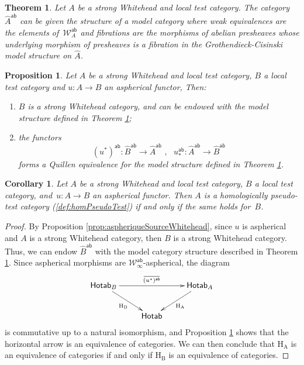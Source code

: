 \documentclass[10pt,a4paper]{amsart}
\newtheorem{prop}{Proposition}
\newtheorem{theorem}{Theorem}
\newtheorem{coro}{Corollary}
\newcommand{\Hf}[1]{\operatorname{H_{#1}}}
\newcommand{\Hotab}{\operatorname{\mathsf{Hotab}}}
\newcommand{\W}{\mathcal{W}}
\newcommand{\Wab}{\W^{\ab}}
\newcommand{\ab}{{\mathsf{ab}}}
\newcommand{\mdvirg}{\text{ ,}\hspace{10pt}}
\newcommand{\overbar}[1]{\mkern 1.5mu\overline{\mkern-1.5mu#1\mkern-1.5mu}\mkern 1.5mu}
\newcommand{\pref}[1]{{\widehat{ #1 }}}
\newcommand{\prefab}[1]{\widehat{ #1 }^{\mathsf{ab}}}
\begin{document}
\begin{theorem}\label{thm:modelStructureAbPresheaves}
Let $A$ be a strong Whitehead and local test category. The category
$\prefab{A}$ can be given the structure of a model category where weak
equivalences are the elements of~$\Wab_A$ and fibrations are the morphisms of
abelian presheaves whose underlying morphism of presheaves is a
fibration in the Grothendieck-Cisinski model structure on $\pref{A}$.
\end{theorem}

\begin{prop}\label{prop:foncteurAspheriqueEqQuillenAb}
Let $A$ be a strong Whitehead and local test category, $B$ a local test
category and $u: A \to B$ an aspherical functor, Then:
\begin{enumerate}
\item $B$ is a strong Whitehead category, and can be endowed with the model
structure defined in Theorem \ref{thm:modelStructureAbPresheaves};
\item the functors
\[
  (u^*)^\ab: \prefab{B} \to \prefab{A}\mdvirg u_*^\ab: \prefab{A} \to
  \prefab{B}
\]
forms a Quillen equivalence for the model structure defined in Theorem
\ref{thm:modelStructureAbPresheaves}.
\end{enumerate}
\end{prop}

\begin{coro}\label{coro:fonctAspheriqueTestLocalWhiteheadPsTestHomEq}
Let $A$ be a strong Whitehead and local test category, $B$ a local test
category, and~$u: A \to B$ an aspherical functor. Then $A$ is a
homologically pseudo-test category (\ref{def:homPseudoTest}) if and only if the same holds for~$B$.
\end{coro}
\begin{proof}
By Proposition \ref{prop:aspheriqueSourceWhitehead}, since $u$ is
aspherical and $A$ is a strong Whitehead category, then $B$ is a strong Whitehead
category. Thus, we can endow $\prefab{B}$ with the model category
structure described in Theorem \ref{thm:modelStructureAbPresheaves}.
Since aspherical morphisms are $\Wab_\infty$-aspherical, the diagram
\[
\xymatrix{
\Hotab_B \ar[rr]^{\overbar{(u^*)^\ab}} \ar[rd]_{\Hf{B}} && \Hotab_{A}
\ar[ld]^{\Hf{A}} \\
& \Hotab 
} 
\]
is commutative up to a natural isomorphism, and Proposition
\ref{prop:foncteurAspheriqueEqQuillenAb} 
shows that the horizontal arrow is an equivalence of categories. We
can then conclude that $\Hf{A}$ is an equivalence of categories if and
only if $\Hf{B}$ is an equivalence of categories.
\end{proof}
\end{document}

